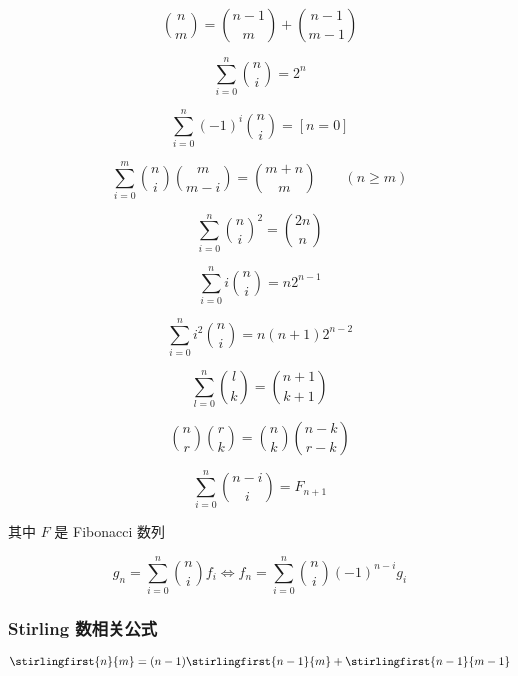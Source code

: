\begin{equation}
    \binom{n}{m}=\binom{n-1}{m}+\binom{n-1}{m-1}
\end{equation}

\begin{equation}
    \sum_{i=0}^n\binom{n}{i}=2^n
\end{equation}

\begin{equation}
    \sum_{i=0}^n(-1)^i\binom{n}{i}=[n=0]
\end{equation}

\begin{equation}
    \sum_{i=0}^m \binom{n}{i}\binom{m}{m-i} = \binom{m+n}{m}\qquad(n \geq m)
\end{equation}

\begin{equation}
    \sum_{i=0}^n\binom{n}{i}^2=\binom{2n}{n}
\end{equation}

\begin{equation}
    \sum_{i=0}^ni\binom{n}{i}=n2^{n-1}
\end{equation}

\begin{equation}
    \sum_{i=0}^ni^2\binom{n}{i}=n(n+1)2^{n-2}
\end{equation}

\begin{equation}
    \sum_{l=0}^n\binom{l}{k} = \binom{n+1}{k+1}
\end{equation}

\begin{equation}
    \binom{n}{r}\binom{r}{k} = \binom{n}{k}\binom{n-k}{r-k}
\end{equation}

\begin{equation}
    \sum_{i=0}^n\binom{n-i}{i}=F_{n+1}
\end{equation}

其中 \(F\) 是 Fibonacci 数列

\begin{equation}
    g_n = \sum_{i = 0}^{n} \binom{n}{i} f_i \iff f_n = \sum_{i = 0}^{n} \binom{n}{i} (-1)^{n-i} g_i
\end{equation}

\subsubsection{Stirling 数相关公式}

\begin{equation}
    \stirlingfirst{n}{m}=(n-1)\stirlingfirst{n-1}{m}+\stirlingfirst{n-1}{m-1}
\end{equation}

